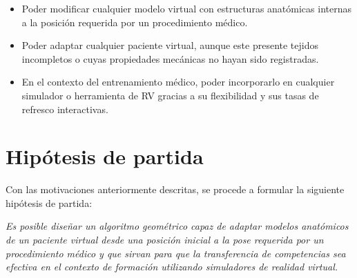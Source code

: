 \begin{itemize}
    \item Poder modificar cualquier modelo virtual con estructuras anatómicas internas a la posición requerida por un procedimiento médico.
    \item Poder adaptar cualquier paciente virtual, aunque este presente tejidos incompletos o cuyas propiedades mecánicas no hayan sido registradas.
    \item En el contexto del entrenamiento médico, poder incorporarlo en cualquier simulador o herramienta de \ac{RV} gracias a su flexibilidad y sus tasas de refresco interactivas. 
\end{itemize}


\section{Hipótesis de partida} 
\label{intro:hipotesis}
Con las motivaciones anteriormente descritas, se procede a formular la siguiente hipótesis de partida:



\begin{center}
    \begin{minipage}{0.9\linewidth}
        {\small
\emph{Es posible diseñar un algoritmo geométrico capaz de adaptar modelos anatómicos de un paciente virtual desde una posición inicial a la pose requerida por un procedimiento médico y que sirvan para que la transferencia de competencias sea efectiva en el contexto de formación utilizando simuladores de realidad virtual. }
        }
    \end{minipage}
    
    
\end{center}




